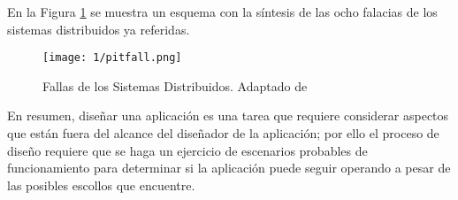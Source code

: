 En la Figura \ref{fig:pitfall} se muestra un esquema con la síntesis de las ocho falacias de los sistemas distribuidos ya referidas.

\begin{figure}%
			\begin{center}
	\texttt{[image: 1/pitfall.png]}
	\caption{Fallas de los Sistemas Distribuidos. Adaptado de \cite{Xu2022} }
	\label{fig:pitfall}
			\end{center}
\end{figure}
En resumen, diseñar una aplicación es una tarea que requiere considerar aspectos que están fuera del alcance del diseñador de la aplicación; por ello el proceso de diseño requiere que se haga un ejercicio de escenarios probables de funcionamiento para determinar si la aplicación puede seguir operando a pesar de las posibles escollos que encuentre.







